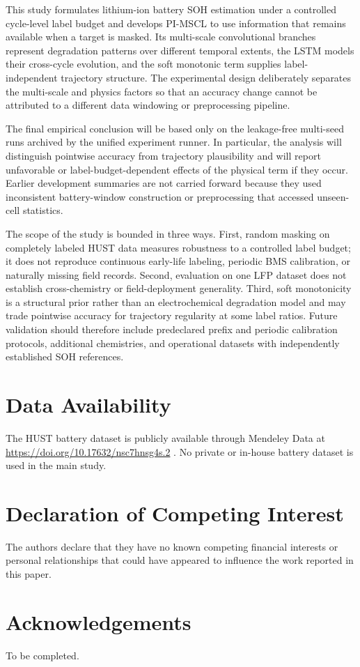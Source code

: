 \documentclass[a4paper,fleqn]{cas-dc}
\begin{document}
This study formulates lithium-ion battery SOH estimation under a controlled cycle-level label budget and develops PI-MSCL to use information that remains available when a target is masked. Its multi-scale convolutional branches represent degradation patterns over different temporal extents, the LSTM models their cross-cycle evolution, and the soft monotonic term supplies label-independent trajectory structure. The experimental design deliberately separates the multi-scale and physics factors so that an accuracy change cannot be attributed to a different data windowing or preprocessing pipeline.

The final empirical conclusion will be based only on the leakage-free multi-seed runs archived by the unified experiment runner. In particular, the analysis will distinguish pointwise accuracy from trajectory plausibility and will report unfavorable or label-budget-dependent effects of the physical term if they occur. Earlier development summaries are not carried forward because they used inconsistent battery-window construction or preprocessing that accessed unseen-cell statistics.

The scope of the study is bounded in three ways. First, random masking on completely labeled HUST data measures robustness to a controlled label budget; it does not reproduce continuous early-life labeling, periodic BMS calibration, or naturally missing field records. Second, evaluation on one LFP dataset does not establish cross-chemistry or field-deployment generality. Third, soft monotonicity is a structural prior rather than an electrochemical degradation model and may trade pointwise accuracy for trajectory regularity at some label ratios. Future validation should therefore include predeclared prefix and periodic calibration protocols, additional chemistries, and operational datasets with independently established SOH references.

\section*{Data Availability}

The HUST battery dataset is publicly available through Mendeley Data at \url{https://doi.org/10.17632/nsc7hnsg4s.2} \cite{Yuan2022HUSTDataset}. No private or in-house battery dataset is used in the main study.

\section*{Declaration of Competing Interest}

The authors declare that they have no known competing financial interests or personal relationships that could have appeared to influence the work reported in this paper.

\section*{Acknowledgements}

To be completed.

\printcredits



\end{document}
